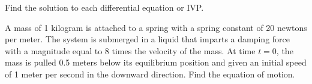 \documentclass[12pt]{exam}
\begin{document}
\begin{questions}


\clearpage

\question
Find the solution to each differential equation or IVP.


\clearpage

\question[20 ]
A mass of 1 kilogram is attached to a spring with a spring constant of 20 newtons per meter.  The system is submerged in a liquid that imparts a damping force with a magnitude equal to 8 times the velocity of the mass.  At time $t = 0$, the mass is pulled 0.5 meters below its equilibrium position and given an initial speed of 1 meter per second in the downward direction.  Find the equation of motion.

\end{questions}
\end{document}
